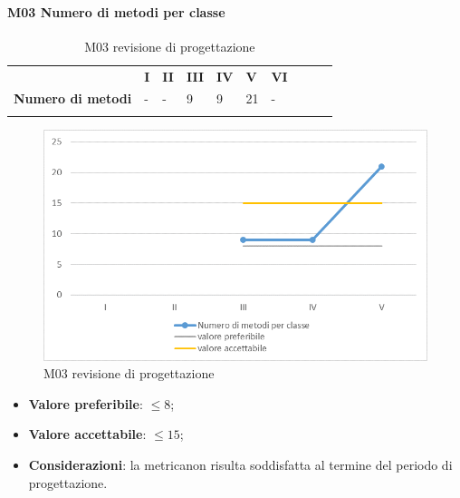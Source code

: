 \paragraph{M03 Numero di metodi per classe} \mbox{}
\begin{longtable}[H!] {						
		>{}p{50mm}  		
		>{}p{8mm}
		>{}p{8mm}		
		>{}p{8mm}		
		>{}p{8mm}		
		>{}p{8mm}		
		>{}p{8mm}
		>{}p{8mm}
		>{}p{8mm}
		>{}p{8mm}
	}
	\rowcolor{gray!50}
	\textbf{} & \textbf{I} & \textbf{II} & \textbf{III} & \textbf{IV} & \textbf{V} & \textbf{VI} \TBstrut \\ [2mm]
	\textbf{Numero di metodi} & - & - & 9 & 9 & 21 & - \TBstrut \\ [2mm]
	\rowcolor{white}
	\caption{M03 revisione di progettazione\glo}
\end{longtable}
\begin{figure}[H] 	
\includegraphics[width=\linewidth]{./img/grafici/RP3.png}	
\caption{M03 revisione di progettazione\glo}	
\end{figure}
\begin{itemize}
	\item \textbf{Valore preferibile}: $\le8$;
	\item \textbf{Valore accettabile}: $\le15$;
	\item \textbf{Considerazioni}: la metrica\glosp non risulta soddisfatta al termine del periodo di progettazione\glo.
\end{itemize}

